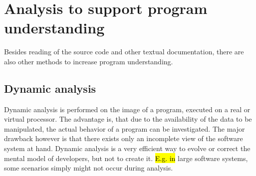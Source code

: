 \section{Analysis to support program understanding}

Besides reading of the source code and other textual documentation, there are also other methods to increase program understanding.

\subsection{Dynamic analysis}

Dynamic analysis is performed on the image of a program, executed on a real or virtual processor. The advantage is, that due to the availability of the data to be manipulated, the actual behavior of a program can be investigated. The major drawback however is that there exists only an incomplete view of the software system at hand\cite{Ball:1999:CDA:318774.318944}. Dynamic analysis is a very efficient way to evolve or correct the mental model of developers, but not to create it. \hl{E.g. in} large software systems, some scenarios simply might not occur during analysis.

